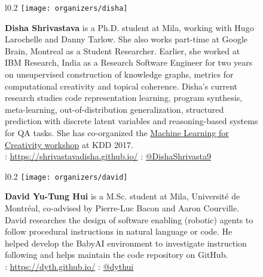 \documentclass{article}
\begin{document}
    \begin{figure}[H]
        \begin{wrapfigure}{l}{0.2\textwidth}
            \texttt{[image: organizers/disha]}
        \end{wrapfigure}\textbf{Disha Shrivastava} is a Ph.D. student at Mila, working with Hugo Larochelle and Danny Tarlow. She also works part-time at Google Brain, Montreal as a Student Researcher. Earlier, she worked at IBM Research, India as a Research Software Engineer for two years on unsupervised construction of knowledge graphs, metrics for computational creativity and topical coherence. Disha's current research studies code representation learning, program synthesis, meta-learning, out-of-distribution generalization, structured prediction with discrete latent variables and reasoning-based systems for QA tasks. She has co-organized the \href{https://creativeai.mybluemix.net/}{Machine Learning for Creativity workshop} at KDD 2017.\\
        \faHome: \url{https://shrivastavadisha.github.io/} \faTwitter: \href{https://twitter.com/DishaShrivasta9}{@DishaShrivasta9}
    \end{figure}

    \begin{figure}[H]
        \begin{wrapfigure}{l}{0.2\textwidth}
            \texttt{[image: organizers/david]}
        \end{wrapfigure}\textbf{David Yu-Tung Hui} is a M.Sc. student at Mila, Universit\'e de Montr\'eal, co-advised by Pierre-Luc Bacon and Aaron Courville.  David researches the design of software enabling (robotic) agents to follow procedural instructions in natural language or code.  He helped develop the BabyAI environment to investigate instruction following and helps maintain the code repository on GitHub.
        \\
        \faHome: \url{https://dyth.github.io/} \faTwitter: \href{https://twitter.com/dythui}{@dythui}
    \end{figure}
\end{document}
